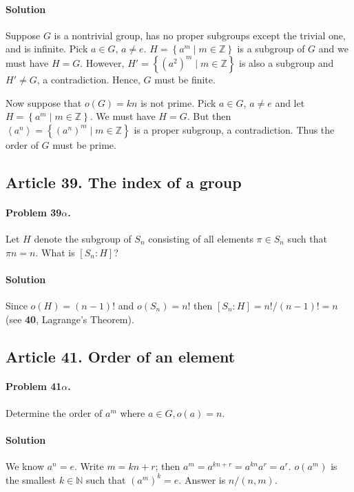 \paragraph*{Solution}
Suppose $G$ is a nontrivial group, has no proper subgroups except the trivial
one, and is infinite. Pick $a \in G$, $a \neq e$. $H=\left\{ a^m \mid m \in
\mathbb{Z} \right\}$ is a subgroup of $G$ and we must have $H=G$. However,
$H' = \left\{ (a^2)^m \mid m \in \mathbb{Z}\right\}$ is also a subgroup and
$H' \neq G$, a contradiction. Hence, $G$ must be finite.

Now suppose that $o(G) = kn$ is not prime. Pick $a\in G$, $a\neq e$ and let
$H = \left\{ a^m \mid m \in \mathbb{Z} \right\}$. We must have $H=G$. But then
$\left<a^n\right> = \left\{ (a^n)^m \mid m \in \mathbb{Z} \right\}$ is a proper subgroup,
a contradiction. Thus the order of $G$ must be prime.

\subsection{Article 39. The index of a group}

\paragraph{Problem 39$\alpha$.}
Let $H$ denote the subgroup of $S_n$ consisting of all elements $\pi \in S_n$
such that $\pi n = n$. What is $[S_n:H]$?

\paragraph*{Solution}
Since $o(H) = (n-1)!$ and $o(S_n) = n!$ then $[S_n:H] = n! / (n-1)! = n$ (see
\textbf{40}, Lagrange's Theorem).

\subsection{Article 41. Order of an element}

\paragraph{Problem 41$\alpha$.}
Determine the order of $a^m$ where $a\in G, o(a)=n$.

\paragraph*{Solution}
We know $a^n=e$. Write $m=kn+r$; then $a^m=a^{kn+r}=a^{kn}a^r=a^r$.
$o(a^m)$ is the smallest $k \in \mathbb{N}$ such that $(a^m)^k=e$.
Answer is $n /(n, m)$.

